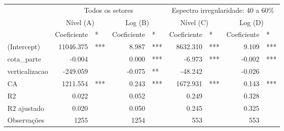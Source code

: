 \begingroup
\fontsize{9.0pt}{10.8pt}\selectfont
\begin{longtable}{lrlrlrlrl}
\toprule
 & \multicolumn{4}{c}{Todos os setores} & \multicolumn{4}{c}{Espectro irregularidade: 40 a 60\%} \\ 
\cmidrule(lr){2-5} \cmidrule(lr){6-9}
 & \multicolumn{2}{c}{Nível (A)    } & \multicolumn{2}{c}{Log (B)    } & \multicolumn{2}{c}{Nível (C)    } & \multicolumn{2}{c}{Log (D)    } \\ 
\cmidrule(lr){2-3} \cmidrule(lr){4-5} \cmidrule(lr){6-7} \cmidrule(lr){8-9}
  & Coeficiente & * & Coeficiente  & *  & Coeficiente   & *   & Coeficiente    & *    \\ 
\midrule\addlinespace[2.5pt]
(Intercept) & 11046.375 & *** & 8.987 & *** & 8632.310 & *** & 9.109 & *** \\ 
cota\_parte & -0.004 &  & 0.000 & *** & -6.973 & *** & -0.002 & *** \\ 
verticalizacao & -249.059 &  & -0.075 & ** & -48.242 &  & -0.026 &  \\ 
CA & 1211.554 & *** & 0.243 & *** & 1672.931 & *** & 0.143 & *** \\ 
{R2} & {0.022} & {} & {0.052} & {} & {0.249} & {} & {0.328} & {} \\ 
R2 ajustado & 0.020 &  & 0.050 &  & 0.245 &  & 0.325 &  \\ 
Observações & 1255 &  & 1254 &  & 553 &  & 553 &  \\ 
\bottomrule
\end{longtable}
\endgroup

